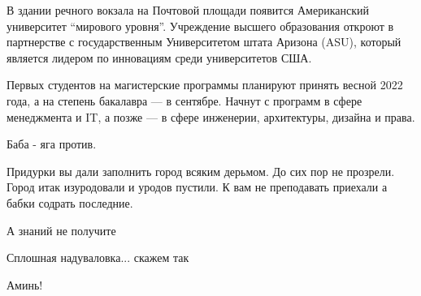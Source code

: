  
 
 
 
 


В здании речного вокзала на Почтовой площади появится Американский университет
\enquote{мирового уровня}. Учреждение высшего образования откроют в партнерстве с
государственным Университетом штата Аризона (ASU), который является лидером по
инновациям среди университетов США.

Первых студентов на магистерские программы планируют принять весной 2022 года,
а на степень бакалавра — в сентябре. Начнут с программ в сфере менеджмента и
IT, а позже — в сфере инженерии, архитектуры, дизайна и права.


Баба - яга против.

Придурки вы дали заполнить город всяким дерьмом. До сих пор не прозрели. Город
итак изуродовали и уродов пустили. К вам не преподавать приехали а бабки
содрать последние.

А знаний не получите

Сплошная надуваловка... скажем так

Аминь!
